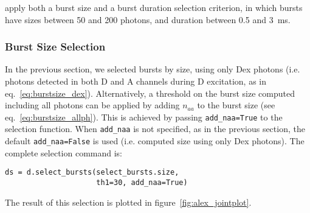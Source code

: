apply both a burst size and a burst duration selection criterion, in which bursts
have sizes between 50 and 200 photons, and duration between 0.5 and 3~ms.

\subsubsection{Burst Size Selection}

In the previous section, we selected bursts by size, using only Dex photons
(i.e. photons detected in both D and A channels during D excitation, as in eq.~\ref{eq:burstsize_dex}).
Alternatively, a threshold on the burst size computed including all photons 
can be applied by adding $n_{aa}$ to the burst size (see eq.~\ref{eq:burstsize_allph}). 
This is achieved
by passing \verb|add_naa=True| to the selection function. When \verb|add_naa| is not specified,
as in the previous section, the default \verb|add_naa=False| is used
(i.e. computed size using only Dex photons). 
The complete selection command is:

\begin{lstlisting}
ds = d.select_bursts(select_bursts.size,
                     th1=30, add_naa=True)
\end{lstlisting}

\noindent The result of this selection is plotted in figure~\ref{fig:alex_jointplot}.